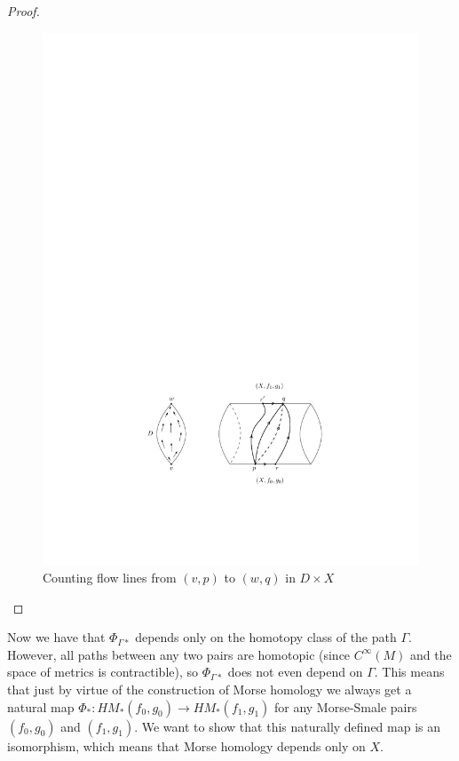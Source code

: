 \begin{proof}
\begin{figure}[tb]
\centering
\includegraphics[scale=1]{graphics/digon}
\caption{Counting flow lines from $(v,p)$ to $(w,q)$ in $D \times X$}
\label{digon}
\end{figure}
\end{proof}


Now we have that $\Phi_{\Gamma*}$ depends only on the homotopy class of the path $\Gamma$. However, all paths between any two pairs are homotopic (since $C^\infty(M)$ and the space of metrics is contractible), so $\Phi_{\Gamma*}$ does not even depend on $\Gamma$. This means that just by virtue of the construction of Morse homology we always get a natural map $\Phi_* : HM_*(f_0,g_0) \rightarrow HM_*(f_1,g_1)$ for any Morse-Smale pairs $(f_0,g_0)$ and $(f_1,g_1)$. We want to show that this naturally defined map is an isomorphism, which means that Morse homology depends only on $X$.

